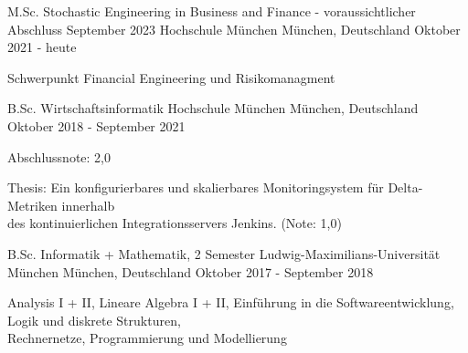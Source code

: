 

\begin{cventries}

   \cventry
    {M.Sc. Stochastic Engineering in Business and Finance - voraussichtlicher Abschluss September 2023} %
    {Hochschule München} %
    {München, Deutschland} %
    {Oktober 2021 - heute} %
    {
      \begin{cvitems} %
        \item {Schwerpunkt Financial Engineering und Risikomanagment }
      \end{cvitems}
    }
    
   \cventry
    {B.Sc. Wirtschaftsinformatik} %
    {Hochschule München} %
    {München, Deutschland} %
    {Oktober 2018 - September 2021} %
    {
      \begin{cvitems} %
        \item {Abschlussnote: 2,0}
        \item {Thesis: \glqq{}Ein konfigurierbares und skalierbares Monitoringsystem für
Delta-Metriken innerhalb\\des kontinuierlichen Integrationsservers Jenkins.\grqq{} (Note: 1,0)}
      \end{cvitems}
    }
  
   \cventry
    {B.Sc. Informatik + Mathematik, 2 Semester} %
    {Ludwig-Maximilians-Universität München} %
    {München, Deutschland} %
    {Oktober 2017 - September 2018} %
    {
      \begin{cvitems} %
        \item {Analysis I + II, Lineare Algebra I + II, Einführung in die Softwareentwicklung, Logik und diskrete Strukturen,\\ Rechnernetze, Programmierung und Modellierung}
      \end{cvitems}
    }
   

\end{cventries}
